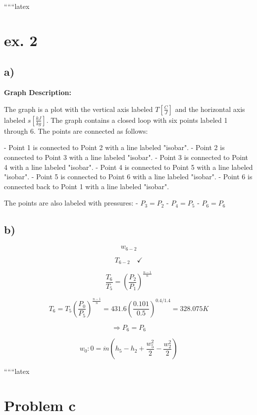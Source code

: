 
``````latex


\section*{ex. 2}

\subsection*{a)}

\begin{center}
\textbf{Graph Description:}
\end{center}

The graph is a plot with the vertical axis labeled \( T \left[ \frac{C}{J} \right] \) and the horizontal axis labeled \( s \left[ \frac{kJ}{kg} \right] \). The graph contains a closed loop with six points labeled 1 through 6. The points are connected as follows:

- Point 1 is connected to Point 2 with a line labeled "isobar".
- Point 2 is connected to Point 3 with a line labeled "isobar".
- Point 3 is connected to Point 4 with a line labeled "isobar".
- Point 4 is connected to Point 5 with a line labeled "isobar".
- Point 5 is connected to Point 6 with a line labeled "isobar".
- Point 6 is connected back to Point 1 with a line labeled "isobar".

The points are also labeled with pressures:
- \( P_3 = P_2 \)
- \( P_4 = P_5 \)
- \( P_6 = P_6 \)

\subsection*{b)}

\[
w_{6-2}
\]

\[
T_{6-2} \quad \checkmark
\]

\[
\frac{T_6}{T_5} = \left( \frac{P_2}{P_1} \right)^{\frac{n-1}{n}}
\]

\[
T_6 = T_5 \left( \frac{P_0}{P_5} \right)^{\frac{n-1}{n}} = 431.6 \left( \frac{0.101}{0.5} \right)^{0.4/1.4} = \boxed{328.075 K}
\]

\[
\Rightarrow P_6 = P_6
\]

\[
w_0 : 0 = \dot{m} (h_5 - h_2 + \frac{w_5^2}{2} - \frac{w_2^2}{2})
\]

``````latex


\section*{Problem c}

